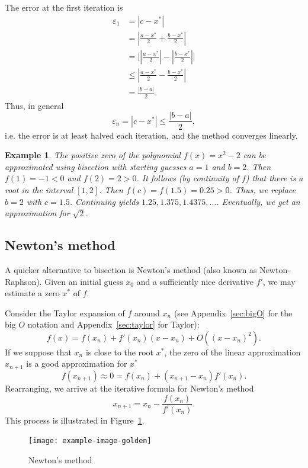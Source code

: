 \documentclass[11pt, a4paper]{article}
\renewcommand{\epsilon}{\varepsilon}
\theoremstyle{break}
\newtheorem{eg}[thm]{Example}
\newcommand*{\Size}[1]{{\left|#1\right|}}%
\begin{document}
The error at the first iteration is \begin{align*}
\epsilon_1 &= |c - x^*| \\&= \Size{\frac{a-x^*}{2}+\frac{b-x^*}{2}}\\&= \Bigg|\Size{\frac{a-x^*}{2}}-\Size{\frac{b-x^*}{2}}\Bigg| \\&\leq \Size{\frac{a-x^*}{2}-\frac{b-x^*}{2}}\\
&= \frac{|b-a|}{2}.\end{align*}
Thus, in general \[\epsilon_n = |c-x^*| \leq \frac{|b-a|}{2},\] i.e. the error is at least halved each iteration, and the method converges linearly.
\begin{eg}
The positive zero of the polynomial $f(x)=x^2-2$ can be approximated using bisection with starting guesses $a=1$ and $b=2$. Then $f(1)=-1<0$ and $f(2)=2>0$. It follows (by continuity of $f$) that there is a root in the interval $[1,2]$. Then $f(c)=f(1.5)=0.25>0$. Thus, we replace $b=2$ with $c=1.5$. Continuing yields $1.25, 1.375, 1.4375, \ldots$. Eventually, we get an approximation for  $\sqrt 2$.
\end{eg}

\subsection{Newton's method}
A quicker alternative to bisection is Newton's method (also known as Newton-Raphson). Given an initial guess $x_0$ and a sufficiently nice derivative $f'$, we may estimate a zero $x^*$ of $f$.

Consider the Taylor expansion of $f$ around $x_n$ (see Appendix~\ref{sec:bigO} for the big $O$ notation and Appendix~\ref{sec:taylor} for Taylor): \[f(x)=f(x_n)+f'(x_n)(x-x_n)+O((x-x_n)^2).\] If we suppose that $x_n$ is close to the root $x^*$, the zero of the linear approximation $x_{n+1}$ is a good approximation for $x^*$ \[f(x_{n+1})\approx 0=f(x_n)+(x_{n+1}-x_n)f'(x_n).\] Rearranging, we arrive at the iterative formula for Newton's method \begin{equation}\label{eq:newtonStep} x_{n+1} = x_n-\frac{f(x_n)}{f'(x_n)}.\end{equation} This process is illustrated in Figure~\ref{fig:taylor}.

\begin{figure}\centering
	\texttt{[image: example-image-golden]}
	\caption{Newton's method}\label{fig:taylor}
\end{figure}
\end{document}
